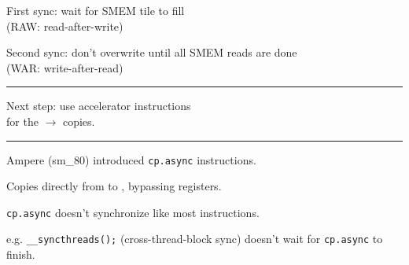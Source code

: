 \newpage
{}

{\LARGE
First sync: wait for SMEM tile to fill\\(RAW: read-after-write)

Second sync: don't overwrite until all SMEM reads are done\\(WAR: write-after-read)

}

\vfill
\hrule
\vfill

\begin{center}
\Large
\begin{tikzpicture}[node distance=0mm]

\end{tikzpicture}
\end{center}

\newpage
{}

{\LARGE
Next step: use accelerator instructions\\for the $\to$ copies.

}

\vfill
\hrule
\vfill

\begin{center}
\Large
{}
\end{center}


\newpage
{}

{\LARGE
Ampere (sm\_80) introduced \texttt{cp.async} instructions.

Copies directly from  to , bypassing registers.

}
\vfill

\begin{center}
\Large
\begin{tikzpicture}[node distance=0mm]

\end{tikzpicture}
\end{center}


\newpage
{}

{\LARGE
\texttt{cp.async} doesn't synchronize like most instructions.

e.g. \texttt{\_\_syncthreads();} (cross-thread-block sync) doesn't wait for \texttt{cp.async} to finish.

}
\vfill

